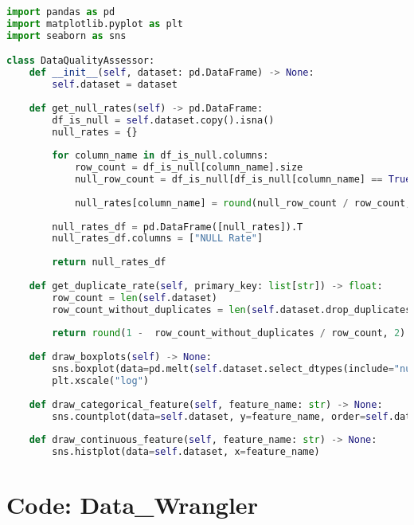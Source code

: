 \documentclass[sigconf]{acmart}
\begin{document}
\begin{lstlisting}[language=Python]
import pandas as pd
import matplotlib.pyplot as plt
import seaborn as sns

class DataQualityAssessor:
    def __init__(self, dataset: pd.DataFrame) -> None:
        self.dataset = dataset
        
    def get_null_rates(self) -> pd.DataFrame:
        df_is_null = self.dataset.copy().isna()
        null_rates = {}
        
        for column_name in df_is_null.columns:
            row_count = df_is_null[column_name].size
            null_row_count = df_is_null[df_is_null[column_name] == True][column_name].size
            
            null_rates[column_name] = round(null_row_count / row_count, 2)
            
        null_rates_df = pd.DataFrame([null_rates]).T
        null_rates_df.columns = ["NULL Rate"]
            
        return null_rates_df
    
    def get_duplicate_rate(self, primary_key: list[str]) -> float:
        row_count = len(self.dataset)
        row_count_without_duplicates = len(self.dataset.drop_duplicates(subset=primary_key))
        
        return round(1 -  row_count_without_duplicates / row_count, 2)
    
    def draw_boxplots(self) -> None:
        sns.boxplot(data=pd.melt(self.dataset.select_dtypes(include="number")), x="value", y="variable")
        plt.xscale("log")
        
    def draw_categorical_feature(self, feature_name: str) -> None:
        sns.countplot(data=self.dataset, y=feature_name, order=self.dataset[feature_name].value_counts().index)
        
    def draw_continuous_feature(self, feature_name: str) -> None:
        sns.histplot(data=self.dataset, x=feature_name)
\end{lstlisting}

\section{Code: Data\_Wrangler}
\label{sec:datawrangler}
\end{document}

